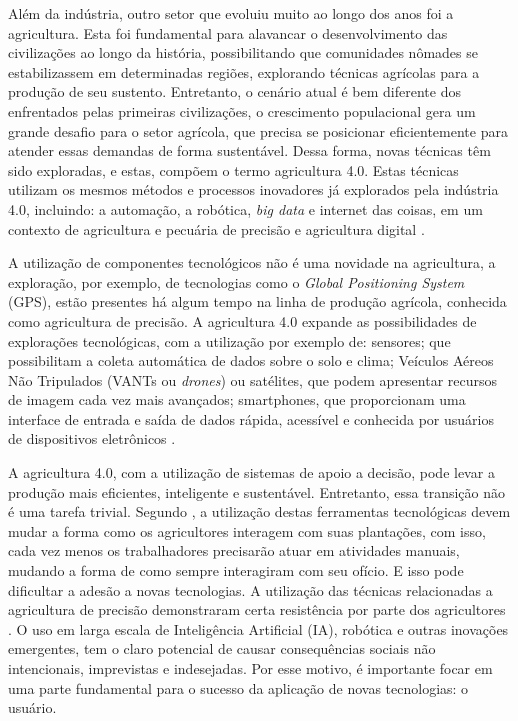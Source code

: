 \documentclass[12pt]{article}
\begin{document}
Além da indústria, outro setor que evoluiu muito ao longo dos anos foi a agricultura. Esta foi fundamental para alavancar o desenvolvimento das civilizações ao longo da história, possibilitando que comunidades nômades se estabilizassem em determinadas regiões, explorando técnicas agrícolas para a produção de seu sustento. Entretanto, o cenário atual é bem diferente dos enfrentados pelas primeiras civilizações, o crescimento populacional gera um grande desafio para o setor agrícola, que precisa se posicionar eficientemente para atender essas demandas de forma sustentável. Dessa forma, novas técnicas têm sido exploradas, e estas, compõem o termo agricultura 4.0. Estas técnicas utilizam os mesmos métodos e processos inovadores já explorados pela indústria 4.0, incluindo: a automação, a robótica, \textit{big data} e internet das coisas, em um contexto de agricultura e pecuária de precisão e agricultura digital \cite{Ribeiro:2018}.

A utilização de componentes tecnológicos não é uma novidade na agricultura, a exploração, por exemplo, de tecnologias como o \textit{Global Positioning System} (GPS), estão presentes há algum tempo na linha de produção agrícola, conhecida como agricultura de precisão. A agricultura 4.0 expande as possibilidades de explorações tecnológicas, com a utilização por exemplo de: sensores; que possibilitam a coleta automática de dados sobre o solo e clima; Veículos Aéreos Não Tripulados (VANTs ou \textit{drones}) ou satélites, que podem apresentar recursos de imagem cada vez mais avançados; smartphones, que proporcionam uma interface de entrada e saída de dados rápida, acessível e conhecida por usuários de dispositivos eletrônicos \cite{Shepherd:2018}.

A agricultura 4.0, com a utilização de sistemas de apoio a decisão, pode levar a produção mais eficientes, inteligente e sustentável. Entretanto, essa transição não é uma tarefa trivial. Segundo , a utilização destas ferramentas tecnológicas devem mudar a forma como os agricultores interagem com suas plantações, com isso, cada vez menos os trabalhadores precisarão atuar em atividades manuais, mudando a forma de como sempre interagiram com seu ofício. E isso pode dificultar a adesão a novas tecnologias. A utilização das técnicas relacionadas a agricultura de precisão demonstraram certa resistência por parte dos agricultores \cite{Rose:2019}. O uso em larga escala de Inteligência Artificial (IA), robótica e outras inovações emergentes, tem o claro potencial de causar consequências sociais não intencionais, imprevistas e indesejadas. Por esse motivo, é importante focar em uma parte fundamental para o sucesso da aplicação de novas tecnologias: o usuário.
\end{document}
